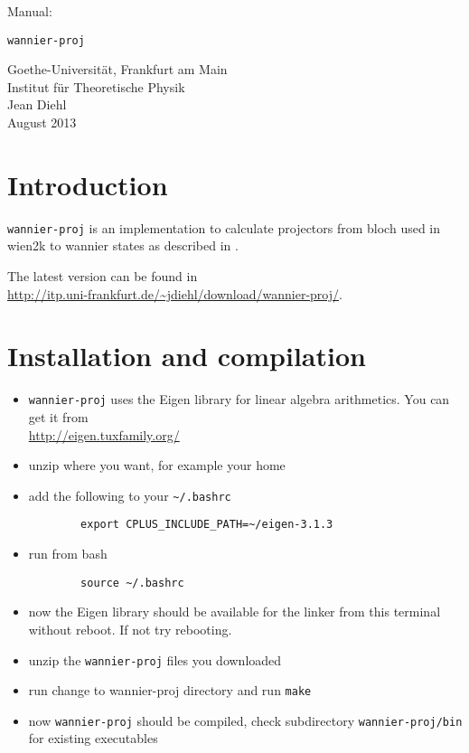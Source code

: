 \documentclass[a4paper,bibtotocnumbered]{scrartcl}
\begin{document}
\begin{center} 
\sffamily
\vspace*{5mm}

\Huge{Manual:}

\Huge{\texttt{wannier-proj}}
\vspace{7mm}

\normalsize{
Goethe-Universität, Frankfurt am Main \\
Institut für Theoretische Physik \\
Jean Diehl\\
August 2013}
\vspace{38mm}

\end{center}

\section{Introduction}
\texttt{wannier-proj} is an implementation to calculate projectors from bloch used in wien2k to wannier states as described in \cite{aichhorn}.

The latest version can be found in\\ \url{http://itp.uni-frankfurt.de/~jdiehl/download/wannier-proj/}.

\section{Installation and compilation}
\begin{itemize}
	\item \texttt{wannier-proj} uses the Eigen library for linear algebra arithmetics. You can get it from\\
	\url{http://eigen.tuxfamily.org/}
	\item unzip where you want, for example your home
	\item add the following to your \texttt{\textasciitilde /.bashrc}
	\begin{verbatim}
		export CPLUS_INCLUDE_PATH=~/eigen-3.1.3
	\end{verbatim}
	\item run from bash
	\begin{verbatim}
		source ~/.bashrc
	\end{verbatim}
	\item now the Eigen library should be available for the linker from this
	terminal without reboot. If not try rebooting.
	
	\item unzip the \texttt{wannier-proj} files you downloaded
	\item run change to wannier-proj directory and run \texttt{make}
	\item now \texttt{wannier-proj} should be compiled, check subdirectory \texttt{wannier-proj/bin}
	for existing executables
\end{itemize}
\end{document}

